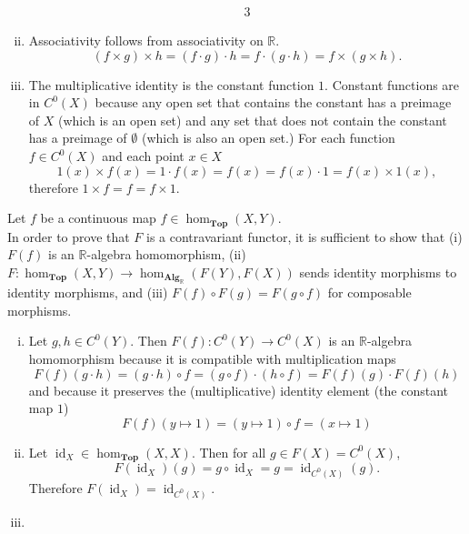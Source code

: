 \documentclass{article}
\newenvironment{problem}[2][Problem]{\begin{trivlist}
\item[\hskip \labelsep {\bfseries #1}\hskip \labelsep {\bfseries #2.}]}{\end{trivlist}}
\newenvironment{problempart}[1]{\begin{trivlist}\item[\textbf{Part #1.}]}{\end{trivlist}}
\begin{document}
\begin{problem}{7}
\begin{problempart}{(b)}
\begin{enumerate}[(i)]
\begin{alignat*}{3}
      \end{alignat*}
      \item Associativity follows from associativity on $\mathbb{R}$. \[
        (f \times g) \times h = (f \cdot g) \cdot h = f \cdot (g \cdot h) = f \times (g \times h).
      \]
      \item The multiplicative identity is the constant function $1$. Constant
      functions are in $C^0(X)$ because any open set that contains the constant
      has a preimage of $X$ (which is an open set) and any set that does not
      contain the constant has a preimage of $\emptyset$ (which is also an open set.)
      For each function $f\in C^0(X)$ and each point $x \in X$ \[
        1(x) \times f(x) = 1 \cdot f(x) = f(x) = f(x) \cdot 1 = f(x) \times 1(x),
      \] therefore $1 \times f = f = f \times 1$.
    \end{enumerate}
  \end{problempart}
  \begin{problempart}{(c)}
    Let $f$ be a continuous map $f \in \operatorname{hom}_{\textbf{Top}}(X, Y)$.\\
    In order to prove that $F$ is a contravariant functor, it is sufficient to show that
      (i) $F(f)$ is an $\mathbb{R}$-algebra homomorphism,
      (ii) $F\colon\operatorname{hom}_{\textbf{Top}}(X,Y) \rightarrow \operatorname{hom}_{\textbf{Alg}_\mathbb{R}}(F(Y), F(X))$
        sends identity morphisms to identity morphisms, and
      (iii) $F(f) \circ F(g) = F(g\circ f)$ for composable morphisms.
    \begin{enumerate}[(i)]
      \item{
        Let $g,h \in C^0(Y)$.
        Then $F(f)\colon C^0(Y) \rightarrow C^0(X)$ is an $\mathbb{R}$-algebra
        homomorphism because it is compatible with multiplication maps \[
          F(f)(g \cdot h) = (g \cdot h)\circ f
          = (g \circ f) \cdot (h\circ f)
          = F(f)(g) \cdot F(f)(h)
        \] and because it preserves the (multiplicative) identity element
        (the constant map $1$) \[
          F(f)(y\mapsto 1) = (y \mapsto 1) \circ f = (x \mapsto 1)
        \]
      }
      \item{
        Let $\operatorname{id}_X \in \operatorname{hom}_{\textbf{Top}}(X, X)$.
        Then for all $g \in F(X) = C^0(X)$, \[
          F(\operatorname{id}_X)(g) = g \circ \operatorname{id}_X
          = g
          = \operatorname{id}_{C^0(X)}(g).
        \] Therefore $F(\operatorname{id}_X) = \operatorname{id}_{C^0(X)}$.
      }
      \item{
}
\end{enumerate}
\end{problempart}
\end{problem}
\end{document}
